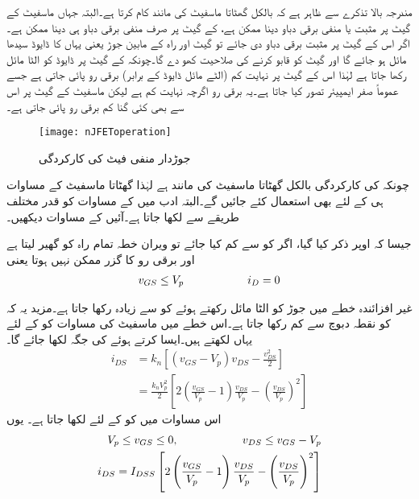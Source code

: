 مندرجہ بالا تذکرے سے ظاہر ہے کہ  بالکل گھٹاتا ماسفیٹ کی مانند کام کرتا ہے۔البتہ جہاں ماسفیٹ کے گیٹ پر مثبت یا منفی برقی دباو دینا ممکن ہے،  کے گیٹ پر صرف منفی برقی دباو ہی دینا ممکن ہے۔اگر اس کے گیٹ پر مثبت برقی دباو دی جائے تو گیٹ اور راہ کے مابین  جوڑ یعنی یہاں کا ڈایوڈ سیدھا مائل ہو جائے گا اور گیٹ  کو قابو کرنے کی صلاحیت کھو دے گا۔چونکہ  کے گیٹ پر ڈایوڈ کو الٹا مائل رکھا جاتا ہے لہٰذا اس کے گیٹ پر نہایت کم (الٹے مائل ڈایوڈ کے برابر) برقی رو پائی جاتی ہے جسے عموماً صفر ایمپیئر تصور کیا جاتا ہے۔یہ برقی رو اگرچہ نہایت کم ہے لیکن ماسفیٹ کے گیٹ پر اس سے بھی کئی گنا کم برقی رو پائی جاتی ہے۔
\begin{figure}
\centering
\texttt{[image: nJFEToperation]}
\caption{جوڑدار منفی فیٹ کی کارکردگی}
\label{شکل_جوڑدار_منفی_فیٹ_کارکردگی}
\end{figure}

چونکہ  کی کارکردگی بالکل گھٹاتا ماسفیٹ کی مانند ہے لہٰذا گھٹاتا ماسفیٹ کے مساوات ہی   کے لئے بھی  استعمال کئے جائیں گے۔البتہ  ادب میں  کے مساوات کو قدر مختلف طریقے سے لکھا جاتا ہے۔آئیں  کے مساوات دیکھیں۔

جیسا کہ اوپر ذکر کیا گیا، اگر  کو  سے کم کیا جائے تو ویران خطہ تمام راہ کو گھیر لیتا ہے اور برقی رو کا گزر ممکن نہیں ہوتا یعنی
\begin{align}
v_{GS} \le V_p   \hspace{2 cm}  i_D=0 
\end{align}

غیر افزائندہ خطے میں  جوڑ کو الٹا مائل رکھتے ہوئے  کو  سے زیادہ رکھا جاتا ہے۔مزید یہ کہ  کو نقطہ دبوچ سے کم رکھا جاتا ہے۔اس خطے میں ماسفیٹ کی مساوات  کو  کے لئے  یہاں لکھتے ہیں۔ایسا کرتے ہوئے  کی جگہ  لکھا جائے گا۔
 \begin{align*}
i_{DS} &=k_n \left[ (v_{GS}-V_p) v_{DS}-\frac{v_{DS}^2}{2} \right] \\
&=\frac{k_n V_p^2}{2} \left[ 2 \left(\frac{v_{GS}}{V_p}-1 \right)  \frac{v_{DS}}{V_p}-\left(\frac{v_{DS}}{V_p} \right)^2 \right]
\end{align*}
اس مساوات میں  کو  کے لئے  لکھا جاتا ہے۔ یوں
\begin{gather}
\begin{aligned} \label{مساوات_منفی_فیٹ_غیر_افزائندہ}
V_p \le v_{GS} \le 0, \hspace{2 cm} v_{DS} \le v_{GS}-V_p \\
i_{DS}=I_{DSS} \left[ 2 \left(\frac{v_{GS}}{V_p}-1 \right)  \frac{v_{DS}}{V_p}-\left(\frac{v_{DS}}{V_p} \right)^2 \right]
\end{aligned}
\end{gather}

